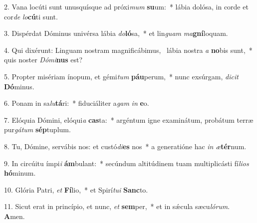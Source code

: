 2. Vana locúti sunt unusquísque ad próxi\textit{mum} \textbf{su}um:~*  lábia dolósa, in corde et cor\textit{de} \textit{lo}\textbf{cú}ti sunt.\

3. Dispérdat Dóminus univérsa lábia \textit{do}\textbf{ló}sa,~*  et lin\textit{guam} \textit{ma}\textbf{gní}loquam.\

4. Qui dixérunt: Linguam nostram magnificábimus, \dag\  lábia nostra \textit{a} \textbf{no}bis sunt,~*  quis noster \textit{Dó}\textit{mi}\textbf{nus} est?\

5. Propter misériam ínopum, et gémi\textit{tum} \textbf{páu}perum,~*  nunc exsúrgam, \textit{di}\textit{cit} \textbf{Dó}minus.\

6. Ponam in sa\textit{lu}\textbf{tá}ri:~*  fiduciáliter a\textit{gam} \textit{in} \textbf{e}o.\

7. Elóquia Dómini, elóqui\textit{a} \textbf{cas}ta:~*  argéntum igne examinátum, probátum terræ pur\textit{gá}\textit{tum} \textbf{sép}tuplum.\

8. Tu, Dómine, servábis nos: et custó\textit{di}\textbf{es} nos~*  a generatióne hac \textit{in} \textit{æ}\textbf{tér}num.\

9. In circúitu ímpi\textit{i} \textbf{ám}bulant:~*  secúndum altitúdinem tuam multiplicásti fí\textit{li}\textit{os} \textbf{hó}minum.\

10. Glória Patri, \textit{et} \textbf{Fí}lio,~*  et Spirí\textit{tu}\textit{i} \textbf{Sanc}to.\

11. Sicut erat in princípio, et nunc, \textit{et} \textbf{sem}per,~*  et in sǽcula sæcu\textit{ló}\textit{rum}. \textbf{A}men.\

